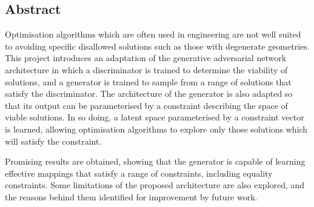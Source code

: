 \documentclass[11pt,landscape]{report}
\newcommand{\importimage}[4]{
    \begin{figure}[H]
        \begin{center}
        \texttt{[image: \#1]}
        \caption[#3]{#2}
        \label{fig:#1}  %
        \end{center}
    \end{figure}
}
\begin{document}
\begin{multicols*}{3}

\begingroup
\let\clearpage\relax

\chapter*{Abstract}

Optimisation algorithms which are often used in engineering are not well suited to avoiding specific disallowed solutions such as those with degenerate geometries.
This project introduces an adaptation of the generative adversarial network architecture in which a discriminator is trained to determine the viability of solutions, and a generator is trained to sample from a range of solutions that satisfy the discriminator.
The architecture of the generator is also adapted so that its output can be parameterised by a constraint describing the space of viable solutions.
In so doing, a latent space parameterised by a constraint vector is learned, allowing optimisation algorithms to explore only those solutions which will satisfy the constraint.

Promising results are obtained, showing that the generator is capable of learning effective mappings that satisfy a range of constraints, including equality constraints.
Some limitations of the proposed architecture are also explored, and the reasons behind them identified for improvement by future work.

\columnbreak

\tableofcontents
\endgroup




% 
% 
% 


% 
% 


% 

\end{multicols*}
\end{document}
